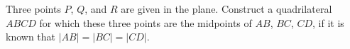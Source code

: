 Three points $P$, $Q$, and $R$ are given in the plane. Construct a quadrilateral $ABCD$ for which these three points are the midpoints of $AB$, $BC$, $CD$, if it is known that $|AB| = |BC| = |CD|$.
